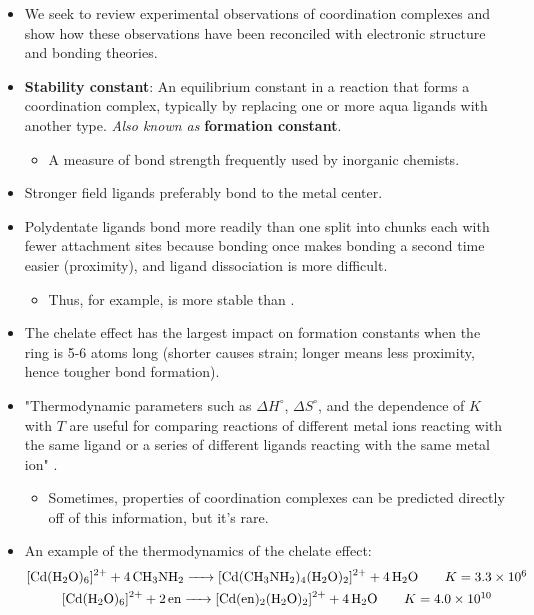 \documentclass[../notes.tex]{subfiles}
\begin{document}
\begin{itemize}
    \item {}We seek to review experimental observations of coordination complexes and show how these observations have been reconciled with electronic structure and bonding theories.
    \item \textbf{Stability constant}: An equilibrium constant in a reaction that forms a coordination complex, typically by replacing one or more aqua ligands with another type. \emph{Also known as} \textbf{formation constant}.
    \begin{itemize}
        \item A measure of bond strength frequently used by inorganic chemists.
    \end{itemize}
    \item Stronger field ligands preferably bond to the metal center.
    \item Polydentate ligands bond more readily than one split into chunks each with fewer attachment sites because bonding once makes bonding a second time easier (proximity), and ligand dissociation is more difficult.
    \begin{itemize}
        \item Thus, for example,  is more stable than .
    \end{itemize}
    \item The chelate effect has the largest impact on formation constants when the ring is 5-6 atoms long (shorter causes strain; longer means less proximity, hence tougher bond formation).
    \item "Thermodynamic parameters such as $\Delta H^\circ$, $\Delta S^\circ$, and the dependence of $K$ with $T$ are useful for comparing reactions of different metal ions reacting with the same ligand or a series of different ligands reacting with the same metal ion" \parencite[358]{bib:MiesslerFischerTarr}.
    \begin{itemize}
        \item Sometimes, properties of coordination complexes can be predicted directly off of this information, but it's rare.
    \end{itemize}
    \item An example of the thermodynamics of the chelate effect:
    \begin{gather*}
        \ce{[Cd(H2O)6]^2+ + 4CH3NH2 -> [Cd(CH3NH2)4(H2O)2]^2+ + 4H2O}\tag*{$K=\num{3.3e6}$}\\
        \ce{[Cd(H2O)6]^2+ + 2en -> [Cd(en)2(H2O)2]^2+ + 4H2O}\tag*{$K=\num{4.0e10}$}

\end{gather*}
\end{itemize}
\end{document}
